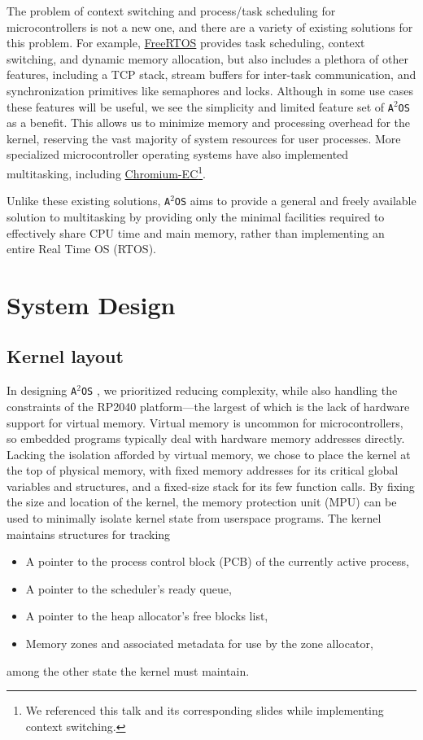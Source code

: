 \documentclass[12pt]{article}
\newcommand{\os}{\texttt{A$^2$OS} }
\begin{document}
The problem of context switching and process/task scheduling for
microcontrollers is not a new one, and there are a variety of existing solutions
for this problem. For example,
\href{https://www.freertos.org/Documentation/02-Kernel/02-Kernel-features/01-Tasks-and-co-routines/00-Tasks-and-co-routines#characteristics-of-a-task}{FreeRTOS}
provides task scheduling, context switching, and dynamic memory allocation, but
also includes a plethora of other features, including a TCP stack, stream
buffers for inter-task communication, and synchronization primitives like
semaphores and locks. Although in some use cases these features will be useful,
we see the simplicity and limited feature set of \os as a benefit. This allows
us to minimize memory and processing overhead for the kernel, reserving the vast
majority of system resources for user processes. More specialized
microcontroller operating systems have also implemented multitasking, including
\href{https://www.youtube.com/watch?v=yHqaspeGJRw}{Chromium-EC}\footnote{We
referenced this talk and its corresponding slides while implementing context
switching.}.

Unlike these existing solutions, \os aims to provide a general and freely
available solution to multitasking by providing only the minimal facilities
required to effectively share CPU time and main memory, rather than implementing
an entire Real Time OS (RTOS).


\section{System Design}
\subsection{Kernel layout}
In designing \os, we prioritized reducing complexity, while also handling the
constraints of the RP2040 platform---the largest of which is the lack of
hardware support for virtual memory. Virtual memory is uncommon for
microcontrollers, so embedded programs typically deal with hardware memory
addresses directly. Lacking the isolation afforded by virtual memory, we chose
to place the kernel at the top of physical memory, with fixed memory addresses
for its critical global variables and structures, and a fixed-size stack for its
few function calls. By fixing the size and location of the kernel, the memory
protection unit (MPU) can be used to minimally isolate kernel state from
userspace programs. The kernel maintains structures for tracking
\begin{itemize}
    \item {A pointer to the process control block (PCB) of the currently active
    process,}
    \item A pointer to the scheduler's ready queue,
    \item A pointer to the heap allocator's free blocks list,
    \item Memory zones and associated metadata for use by the zone allocator,
\end{itemize}
among the other state the kernel must maintain.
\end{document}

